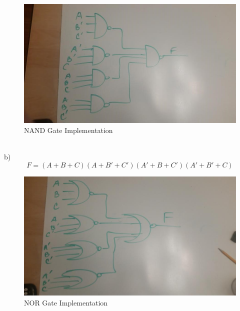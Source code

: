 \documentclass[11pt]{article}
\begin{document}
\begin{figure}[H]
\centering
\includegraphics[width=1\linewidth]{nand}
\caption{NAND Gate Implementation}
\label{fig:nand}
\end{figure}
~\\	
b) $$F = (A+B+C)(A+B'+C')(A'+B+C')(A'+B'+C)$$
\begin{figure}[H]
\centering
\includegraphics[width=0.9\linewidth]{nor}
\caption{NOR Gate Implementation}
\label{fig:nor}
\end{figure}
\end{document}
